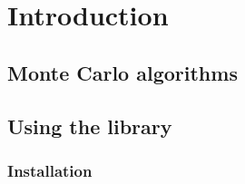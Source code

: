 %
%
%
%

\chapter{Introduction}
\label{chap:Introduction}

\section{Monte Carlo algorithms}
\label{sec:Monte Carlo algorithms}

\section{Using the library}
\label{sec:Using the library}

\subsection{Installation}
\label{sub:Installation}

